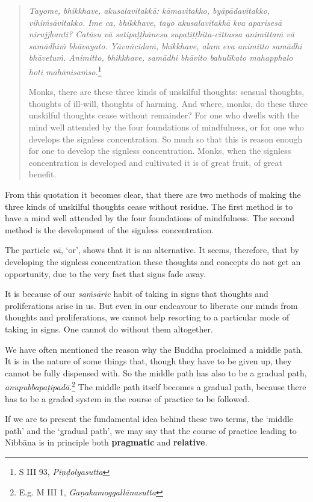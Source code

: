 \begin{quote}
\emph{Tayome, bhikkhave, akusalavitakkā: kāmavitakko, byāpādavitakko, vihiṁsāvitakko. Ime ca, bhikkhave, tayo akusalavitakkā kva aparisesā nirujjhanti? Catūsu vā satipaṭṭhānesu supatiṭṭhita-cittassa animittaṁ vā samādhiṁ bhāvayato. Yāvañcidaṁ, bhikkhave, alam eva animitto samādhi bhāvetuṁ. Animitto, bhikkhave, samādhi bhāvito bahulīkato mahapphalo hoti mahānisaṁso.}\footnote{S III 93, \emph{Piṇḍolyasutta}}

Monks, there are these three kinds of unskilful thoughts: sensual thoughts, thoughts of ill-will, thoughts of harming. And where, monks, do these three unskilful thoughts cease without remainder? For one who dwells with the mind well attended by the four foundations of mindfulness, or for one who develops the signless concentration. So much so that this is reason enough for one to develop the signless concentration. Monks, when the signless concentration is developed and cultivated it is of great fruit, of great benefit.
\end{quote}

From this quotation it becomes clear, that there are two methods of making the three kinds of unskilful thoughts cease without residue. The first method is to have a mind well attended by the four foundations of mindfulness. The second method is the development of the signless concentration.

The particle \emph{vā}, `or', shows that it is an alternative. It seems, therefore, that by developing the signless concentration these thoughts and concepts do not get an opportunity, due to the very fact that signs fade away.

It is because of our \emph{saṁsāric} habit of taking in signs that thoughts and proliferations arise in us. But even in our endeavour to liberate our minds from thoughts and proliferations, we cannot help resorting to a particular mode of taking in signs. One cannot do without them altogether.

We have often mentioned the reason why the Buddha proclaimed a middle path. It is in the nature of some things that, though they have to be given up, they cannot be fully dispensed with. So the middle path has also to be a gradual path, \emph{anupubbapaṭipadā.}\footnote{E.g. M III 1, \emph{Gaṇakamoggallānasutta}} The middle path itself becomes a gradual path, because there has to be a graded system in the course of practice to be followed.

If we are to present the fundamental idea behind these two terms, the `middle path' and the `gradual path', we may say that the course of practice leading to Nibbāna is in principle both \textbf{pragmatic} and \textbf{relative}.

